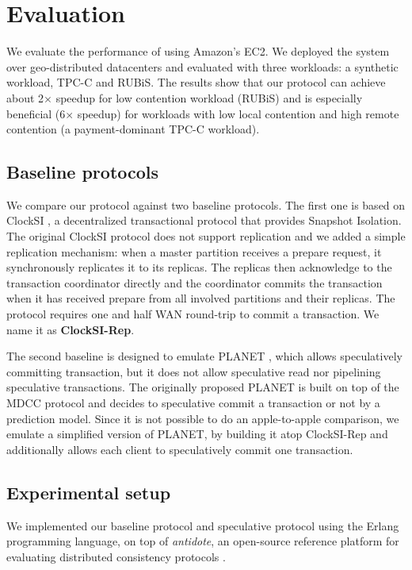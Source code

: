
\section{Evaluation}
\label{sec:evaluation}
We evaluate the performance of {\specula} using Amazon's EC2. We deployed the system over geo-distributed datacenters and evaluated with three workloads: a synthetic workload, TPC-C and RUBiS. The results show that our protocol can achieve about 2$\times$ speedup for low contention workload (RUBiS) and is especially beneficial (6$\times$ speedup) for workloads with low local contention and high remote contention (a payment-dominant TPC-C workload).

\subsection{Baseline protocols}
We compare our protocol against two baseline protocols. The first one is based on ClockSI \cite{ClockSI}, a decentralized transactional protocol that provides Snapshot Isolation. The original ClockSI protocol does not support replication and we added a simple replication mechanism: when a master partition receives a prepare request, it synchronously replicates it to its replicas. The replicas then acknowledge to the transaction coordinator directly and the coordinator commits the transaction when it has received prepare from all involved partitions and their replicas. The protocol requires one and half WAN round-trip to commit a transaction. We name it as \textbf{ClockSI-Rep}.

The second baseline is designed to emulate PLANET \cite{planet}, which allows speculatively committing transaction, but it does not allow speculative read nor pipelining speculative transactions.  The originally proposed PLANET is built on top of the MDCC protocol \cite{MDCC} and decides to speculative commit a transaction or not by a prediction model. Since it is not possible to do an apple-to-apple comparison, we emulate a simplified version of PLANET, by building it atop ClockSI-Rep and additionally allows each client to speculatively commit one transaction. 

\subsection{Experimental setup}
\label{subsec:setup}
We implemented our baseline protocol and speculative protocol using the Erlang programming language, on top of \textit{antidote}, an open-source reference platform for evaluating distributed consistency protocols \cite{antidote}.

